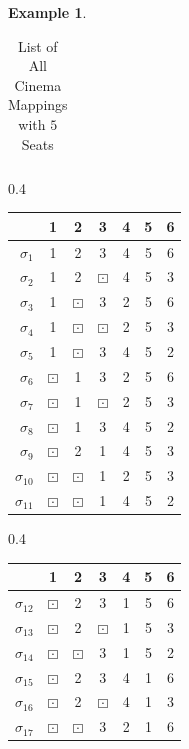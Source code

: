 \documentclass{amsart}
\theoremstyle{definition}
\newtheorem{example}[theorem]{Example}
\begin{document}
\begin{example}
\begin{table}[H]
\begin{tabular}{ r | c c c c c}
         \end{tabular}
\caption{List of All Cinema Mappings with $5$ Seats}
\end{table}

\begin{table}[H]
\begin{subtable}[l]{0.4\textwidth}
\centering
        \begin{tabular}{ r | c c c c c c}
         & 1 & 2 & 3 & 4 & 5 & 6 \\
        \hline
            $\sigma_1$ & 1 & 2 & 3 & 4 & 5 & 6 \\
            $\sigma_2$ & 1 & 2 & $\boxdot$ & 4 & 5 & 3 \\
            $\sigma_3$ & 1 & $\boxdot$ & 3 & 2 & 5 & 6 \\
            $\sigma_4$ & 1 & $\boxdot$ & $\boxdot$ & 2 & 5 & 3 \\
            $\sigma_5$ & 1 & $\boxdot$ & 3 & 4 & 5 & 2 \\
            $\sigma_6$ & $\boxdot$ & 1 & 3 & 2 & 5 & 6 \\
            $\sigma_7$ & $\boxdot$ & 1 & $\boxdot$ & 2 & 5 & 3 \\
            $\sigma_8$ & $\boxdot$ & 1 & 3 & 4 & 5 & 2 \\
            $\sigma_9$ & $\boxdot$ & 2 & 1 & 4 & 5 & 3 \\
            $\sigma_{10}$ & $\boxdot$ & $\boxdot$ & 1 & 2 & 5 & 3 \\
            $\sigma_{11}$ & $\boxdot$ & $\boxdot$ & 1 & 4 & 5 & 2 
         \end{tabular}
\end{subtable}
\begin{subtable}[r]{0.4\textwidth}
\centering
		\begin{tabular}{ r | c c c c c c}
         & 1 & 2 & 3 & 4 & 5 & 6 \\
        \hline
            $\sigma_{12}$ & $\boxdot$ & 2 & 3 & 1 & 5 & 6 \\
            $\sigma_{13}$ & $\boxdot$ & 2 & $\boxdot$ & 1 & 5 & 3 \\
            $\sigma_{14}$ & $\boxdot$ & $\boxdot$ & 3 & 1 & 5 & 2 \\
            $\sigma_{15}$ & $\boxdot$ & 2 & 3 & 4 & 1 & 6 \\
            $\sigma_{16}$ & $\boxdot$ & 2 & $\boxdot$ & 4 & 1 & 3 \\
            $\sigma_{17}$ & $\boxdot$ & $\boxdot$ & 3 & 2 & 1 & 6 \\

\end{tabular}
\end{subtable}
\end{table}
\end{example}
\end{document}
